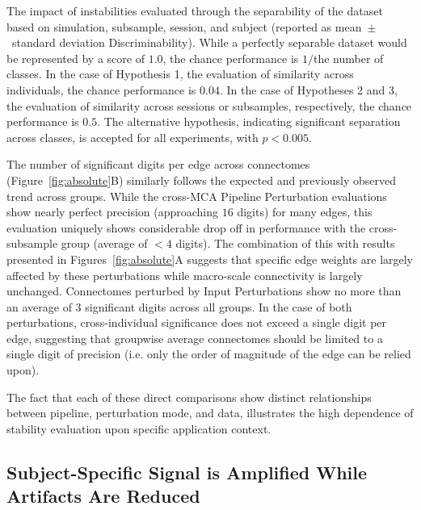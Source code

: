 \documentclass[fleqn,10pt]{SelfArx} %
\begin{document}
\begin{table}[ht]\centering
\caption{The impact of instabilities evaluated through the separability of the dataset based on simulation, subsample,
session, and subject (reported as mean~$\pm$~standard deviation Discriminability). While a perfectly separable dataset
would be represented by a score of $1.0$, the chance performance is $1 /$the number of classes. In the case of
Hypothesis 1, the evaluation of similarity across individuals, the chance performance is $0.04$. In the case of
Hypotheses 2 and 3, the evaluation of similarity across sessions or subsamples, respectively, the chance performance is
$0.5$. The alternative hypothesis, indicating significant separation across classes, is accepted for all experiments,
with $p < 0.005$.}
\vspace{5pt}

\label{tab:discrim}
\end{table}

The number of significant digits per edge across connectomes (Figure~\ref{fig:absolute}B) similarly follows the
expected and previously observed trend across groups. While the cross-MCA Pipeline Perturbation evaluations show nearly
perfect precision (approaching $16$ digits) for many edges, this evaluation uniquely shows considerable drop off in
performance with the cross-subsample group (average of $< 4$ digits). The combination of this with results presented in
Figures~\ref{fig:absolute}A suggests that specific edge weights are largely affected by these perturbations while
macro-scale connectivity is largely unchanged. Connectomes perturbed by Input Perturbations show no more than an
average of $3$ significant digits across all groups. In the case of both perturbations, cross-individual significance
does not exceed a single digit per edge, suggesting that groupwise average connectomes should be limited to a single
digit of precision (i.e. only the order of magnitude of the edge can be relied upon).

The fact that each of these direct comparisons show distinct relationships between pipeline, perturbation mode, and
data, illustrates the high dependence of stability evaluation upon specific application context.

\subsection*{Subject-Specific Signal is Amplified While Artifacts Are Reduced}
\end{document}
